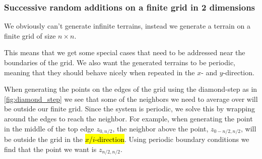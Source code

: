 \subsubsection{Successive random additions on a finite grid in 2 dimensions}
We obviously can't generate infinite terrains, instead we generate a terrain on a finite grid of size $n\times n$. 

This means that we get some special cases that need to be addressed near the boundaries of the grid. We also want the generated terrains to be periodic, meaning that they should behave nicely when repeated in the $x$- and $y$-direction. 

When generating the points on the edges of the grid using the diamond-step as in \cref{fig:diamond_step} we see that some of the neighbors we need to average over will be outside our finite grid. Since the system is periodic, we solve this by wrapping around the edges to reach the neighbor. For example, when generating the point in the middle of the top edge $z_{0, n/2}$, the neighbor above the point, $z_{0-n/2, n/2}$, will be outside the grid in the \hl{$x$/$i$-direction}. Using periodic boundary conditions we find that the point we want is $z_{n/2, n/2}$.



